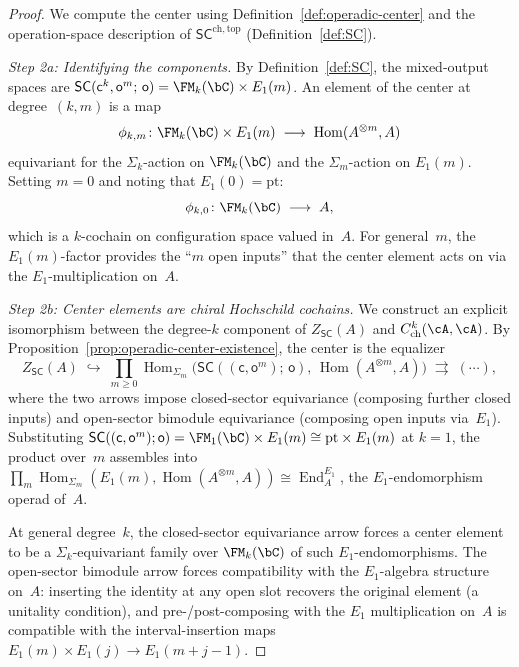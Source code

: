\begin{proof}
We compute the center using
Definition~\ref{def:operadic-center} and the operation-space description of
$\mathsf{SC}^{\mathrm{ch,top}}$
(Definition~\ref{def:SC}).

\emph{Step 2a: Identifying the components.}
By Definition~\ref{def:SC}, the mixed-output spaces are
$\mathsf{SC}(\mathsf{c}^k, \mathsf{o}^m;\, \mathsf{o})
= \FM_k(\bC) \times E_1(m)$.
An element of the center at degree~$(k,m)$ is a map
\[
\phi_{k,m}\colon
\FM_k(\bC) \times E_1(m)
\;\longrightarrow\;
\operatorname{Hom}(A^{\otimes m}, A)
\]
equivariant for the $\Sigma_k$-action on $\FM_k(\bC)$ and the
$\Sigma_m$-action on $E_1(m)$.
Setting $m = 0$ and noting that $E_1(0) = \mathrm{pt}$:
\[
\phi_{k,0}\colon \FM_k(\bC) \;\longrightarrow\; A,
\]
which is a $k$-cochain on configuration space valued in~$A$.
For general~$m$, the $E_1(m)$-factor provides the ``$m$ open inputs''
that the center element acts on via the $E_1$-multiplication on~$A$.

\emph{Step 2b: Center elements are chiral Hochschild cochains.}
We construct an explicit isomorphism between the degree-$k$ component
of $Z_{\mathsf{SC}}(A)$ and $C^k_{\mathrm{ch}}(\cA, \cA)$. By
Proposition~\ref{prop:operadic-center-existence}, the center is the
equalizer
\[
Z_{\mathsf{SC}}(A)
\;\hookrightarrow\;
\prod_{m \geq 0}
\operatorname{Hom}_{\Sigma_m}
\!\bigl(
\mathsf{SC}((\mathsf{c}, \mathsf{o}^m);\, \mathsf{o}),\,
\operatorname{Hom}(A^{\otimes m}, A)
\bigr)
\;\rightrightarrows\;
(\cdots),
\]
where the two arrows impose closed-sector equivariance (composing
further closed inputs) and open-sector bimodule equivariance
(composing open inputs via~$E_1$). Substituting
$\mathsf{SC}((\mathsf{c}, \mathsf{o}^m); \mathsf{o})
= \FM_1(\bC) \times E_1(m) \cong \mathrm{pt} \times E_1(m)$
at $k = 1$, the product over~$m$ assembles into
$\prod_m \operatorname{Hom}_{\Sigma_m}(E_1(m),
\operatorname{Hom}(A^{\otimes m}, A))
\cong \operatorname{End}^{E_1}_{A}$,
the $E_1$-endomorphism operad of~$A$.

At general degree~$k$, the closed-sector equivariance arrow forces a
center element to be a $\Sigma_k$-equivariant family over
$\FM_k(\bC)$ of such $E_1$-endomorphisms. The open-sector bimodule
arrow forces compatibility with the $E_1$-algebra structure on~$A$:
inserting the identity at any open slot recovers the original element
(a unitality condition), and pre-/post-composing with the $E_1$
multiplication on~$A$ is compatible with the interval-insertion maps
$E_1(m) \times E_1(j) \to E_1(m + j - 1)$.


\end{proof}
